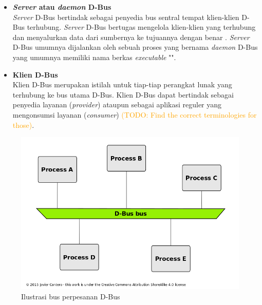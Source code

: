 \begin{itemize}
    \item \textbf{\textit{Server} atau \textit{daemon} D-Bus}\\
    \textit{Server} D-Bus bertindak sebagai penyedia bus sentral tempat klien-klien D-Bus terhubung. \textit{Server} D-Bus bertugas mengelola klien-klien yang terhubung dan menyalurkan data dari sumbernya ke tujuannya dengan benar \cite{qt-introduction-to-dbus}. \textit{Server} D-Bus umumnya dijalankan oleh sebuah proses yang bernama \textit{daemon} D-Bus yang umumnya memiliki nama berkas \textit{executable} "".

    \item \textbf{Klien D-Bus}\\
    Klien D-Bus merupakan istilah untuk tiap-tiap perangkat lunak yang terhubung ke bus utama D-Bus. Klien D-Bus dapat bertindak sebagai penyedia layanan (\textit{provider}) ataupun sebagai aplikasi reguler yang mengonsumsi layanan (\textit{consumer}) \textcolor{orange}{(TODO: Find the correct terminologies for those)}.
\end{itemize}

\begin{figure}
    \centering
    \includegraphics[width=0.75\linewidth]{archives//contents-template-pak-prapto//chapter-2/dbus-analogy-diagram.png}
    \caption{Ilustrasi bus perpesanan D-Bus \cite{dbus-bus-illustration}}
    \label{fig:enter-label}
\end{figure}

